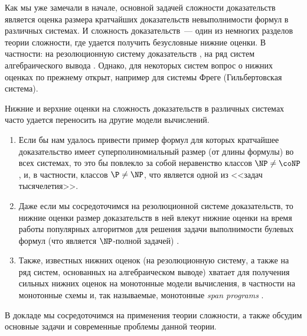Как мы уже замечали в начале, основной задачей сложности доказательств является оценка размера кратчайших
доказательств невыполнимости формул в различных системах. И сложность доказательств~--- один из немногих
разделов теории сложности, где удается получить безусловные нижние оценки. В частности: на резолюционную
систему доказательств \cite{Haken85}, на ряд систем алгебраического вывода
\cite{BIPRS97, CEI96, IPS99}. Однако, для некоторых систем вопрос о нижних оценках по прежнему открыт,
например для системы Фреге (Гильбертовская система).

Нижние и верхние оценки на сложность доказательств в различных системах часто удается переносить на
другие модели вычислений.
\begin{enumerate}
    \item Если бы нам удалось привести пример формул для которых кратчайшее доказательство имеет
        суперполиномиальный размер (от длины формулы) во всех системах, то это бы повлекло за собой
        неравенство классов $\NP \neq \coNP$ \cite{CookRec79}, и, в частности, классов $\P \neq \NP$, что
        является одной из <<задач тысячелетия>>. 
    \item Даже если мы сосредоточимся на резолюционной системе доказательств, то нижние оценки размер
        доказательств в ней влекут нижние оценки на время работы популярных алгоритмов для решения задачи
        выполнимости булевых формул (что является $\NP$-полной задачей) \cite{DP60, AHI05}.
    \item Также, известных нижних оценок (на резолюционную систему, а также на ряд систем, основанных на
        алгебраическом выводе) хватает для получения сильных нижних оценок на монотонные модели
        вычисления, в частности на монотонные схемы и, так называемые, монотонные \textit{span programs}
        \cite{PR18, GGKS18}.
\end{enumerate}

В докладе мы сосредоточимся на применения теории сложности, а также обсудим основные задачи и современные
проблемы данной теории.
